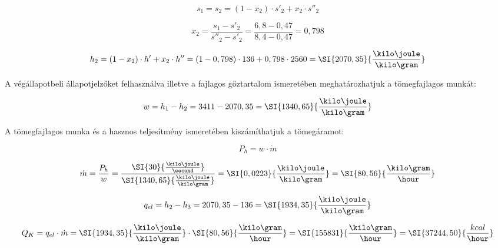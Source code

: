 \begin{equation}
	s_1 = s_2 = (1-x_2)\cdot s'_2 + x_2 \cdot s''_2
\end{equation}

\begin{equation}
	x_2 = \frac{s_1-s'_2}{s''_2-s'_2} = \frac{6,8-0,47}{8,4-0,47} = 0,798
\end{equation}

\begin{equation}
	h_2 = (1-x_2) \cdot h' + x_2 \cdot h'' = (1-0,798) \cdot 136 + 0,798 \cdot 2560 = \SI{2070,35}{\frac{\kilo\joule}{\kilo\gram}}
\end{equation}

\noindent
A végállapotbeli állapotjelzőket felhasználva illetve a fajlagos gőztartalom ismeretében meghatározhatjuk a tömegfajlagos munkát:

\begin{equation}
	w = h_1 - h_2 = 3411 - 2070,35 = \SI{1340,65}{\frac{\kilo\joule}{\kilo\gram}}
\end{equation}

\noindent
A tömegfajlagos munka és a hasznos teljesítmény ismeretében kiszámíthatjuk a tömegáramot:

\begin{equation}
	P_h = w \cdot \dot{m}
\end{equation}

\begin{equation}
	\dot{m} = \frac{P_h}{w} = \frac{\SI{30}{\frac{\kilo\joule}{\second}}}{\SI{1340,65}{\frac{\kilo\joule}{\kilo\gram}}} = \SI{0,0223}{\frac{\kilo\joule}{\kilo\gram}} = \SI{80,56}{\frac{\kilo\gram}{\hour}}
\end{equation}

\begin{equation}
	q_{el} = h_2 - h_3 = 2070,35 - 136 = \SI{1934,35}{\frac{\kilo\joule}{\kilo\gram}}
\end{equation}

\begin{equation}
	Q_K = q_{el} \cdot \dot{m} = \SI{1934,35}{\frac{\kilo\joule}{\kilo\gram}} \cdot \SI{80,56}{\frac{\kilo\gram}{\hour}} = \SI{155831}{\frac{\kilo\gram}{\hour}} = \SI{37244,50}{\frac{kcal}{\hour}}
\end{equation}
\vspace{1cm}

